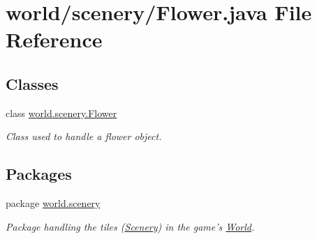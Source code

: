 \hypertarget{a00064}{\section{world/scenery/\-Flower.java File Reference}
\label{a00064}
}
\subsection*{Classes}
\begin{DoxyCompactItemize}
\item 
class \hyperlink{a00009}{world.\-scenery.\-Flower}
\begin{DoxyCompactList}\small\item\em Class used to handle a flower object. \end{DoxyCompactList}\end{DoxyCompactItemize}
\subsection*{Packages}
\begin{DoxyCompactItemize}
\item 
package \hyperlink{a00091}{world.\-scenery}
\begin{DoxyCompactList}\small\item\em Package handling the tiles (\hyperlink{a00024}{Scenery}) in the game's \hyperlink{a00039}{World}. \end{DoxyCompactList}\end{DoxyCompactItemize}

